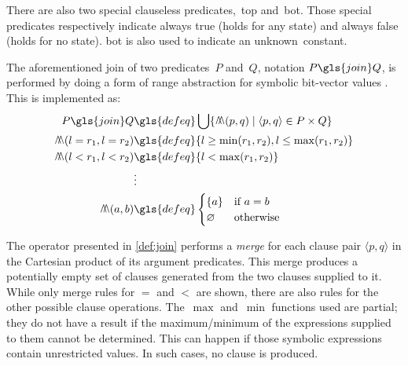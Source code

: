 There are also two special clauseless predicates,~\gls{top}%
and~\gls{bot}.
Those special predicates respectively indicate always true (holds for any state) and always false (holds for no state).
\Gls{bot} is also used to indicate an unknown~\gls{constant}.%
\begin{definition}\label{def:join}
  The aforementioned join
  of two predicates~$P$ and~$Q$,%
  notation $P\gls{join}Q$,
  is performed by doing a form of range abstraction for symbolic bit-vector values \autocite{rugina2000symbolic}.
  This is implemented as:
  \begin{align*} %
    P\gls{join}Q &\gls{defeq} \bigcup\{\merge(p,q) \mid \langle p,q\rangle\in P\times Q\} \\
    \merge(l=r_1,l=r_2) &\gls{defeq} \{l\ge\min(r_1,r_2),l\le\max(r_1,r_2)\} \\
    \merge(l<r_1,l<r_2) &\gls{defeq} \{l<\max(r_1,r_2)\} \\
    &\vdots\\
    \merge(a,b) &\gls{defeq}
    \begin{cases}
      \{a\} & \text{if }a=b \\
      \varnothing & \text{otherwise}
    \end{cases}
  \end{align*}
\end{definition}
The operator presented in \cref{def:join}
performs a \emph{merge} for each clause pair
$\langle p,q\rangle$
in the Cartesian product %
of its argument predicates.
This merge produces a potentially empty set of clauses
generated from the two clauses supplied to it.
While only merge rules for $=$ and $<$ are shown, there are also rules
for the other possible clause operations.
The~$\max$ and~$\min$ functions used are partial;%
%
%
they do not have a result if the maximum/minimum of the expressions supplied to them cannot be determined.%
This can happen if those symbolic expressions
contain unrestricted values.
In such cases, no clause is produced.

